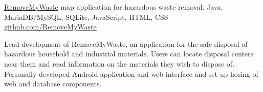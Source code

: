 \showoff
{\textcolor{my-blue}{\href{https://removemywaste.liambeckman.com/}{RemoveMyWaste}}}
{map application for hazardous waste removal.}
{Java, MariaDB/MySQL, SQLite, JavaScript, HTML, CSS}
{\textcolor{my-blue}{\href{https://github.com/RemoveMyWaste/RemoveMyWaste}{github.com/RemoveMyWaste}}}

Lead development of RemoveMyWaste, an application for the safe disposal of hazardous household and industrial materials. Users can locate disposal centers near them and read information on the materials they wish to dispose of. Personally developed Android application and web interface and set up hosing of web and database components.

